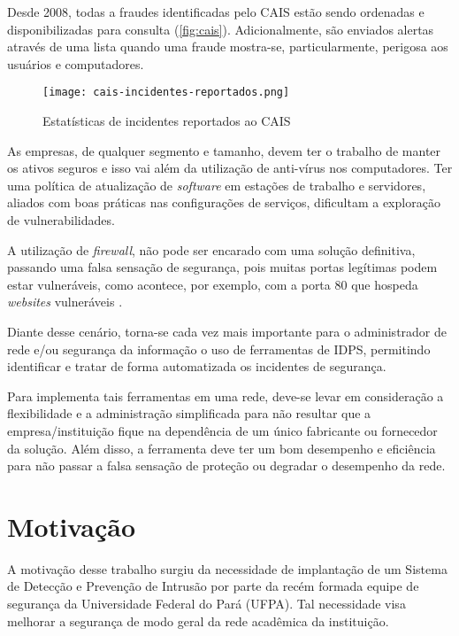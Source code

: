 Desde 2008, todas a fraudes identificadas pelo CAIS estão sendo ordenadas e disponibilizadas para consulta (\autoref{fig:cais}). Adicionalmente, são enviados alertas através de uma lista quando uma fraude mostra-se, particularmente, perigosa aos usuários e computadores.

\begin{figure}[!htb]
 \centering
 \caption{Estatísticas de incidentes reportados ao CAIS}
 \texttt{[image: cais-incidentes-reportados.png]}
 \label{fig:cais}
\end{figure}

As empresas, de qualquer segmento e tamanho, devem ter o trabalho de manter os ativos seguros e isso vai além da utilização de anti-vírus nos computadores. Ter uma política de atualização de \textit{software} em estações de trabalho e servidores, aliados com boas práticas nas configurações de serviços, dificultam a exploração de vulnerabilidades. 

A utilização de \textit{firewall}, não pode ser encarado com uma solução definitiva, passando uma falsa sensação de segurança, pois muitas portas legítimas podem estar vulneráveis, como acontece, por exemplo, com a porta 80 que hospeda \textit{websites} vulneráveis \cite{analisenessus:cleriston}.

Diante desse cenário, torna-se cada vez mais importante para o administrador de rede e/ou segurança da informação o uso de ferramentas de IDPS, permitindo identificar e tratar de forma automatizada os incidentes de segurança.

Para implementa tais ferramentas em uma rede, deve-se levar em consideração a flexibilidade e a administração simplificada para não resultar que a empresa/instituição fique na dependência de um único fabricante ou fornecedor da solução. Além disso, a ferramenta deve ter um bom desempenho e eficiência para não passar a falsa sensação de proteção ou degradar o desempenho da rede.

\section{Motivação} \label{sec:motivação} 

A motivação desse trabalho surgiu da necessidade de implantação de um Sistema de Detecção e Prevenção de Intrusão por parte da recém formada equipe de segurança da Universidade Federal do Pará (UFPA). Tal necessidade visa melhorar a segurança de modo geral da rede acadêmica da instituição. 

